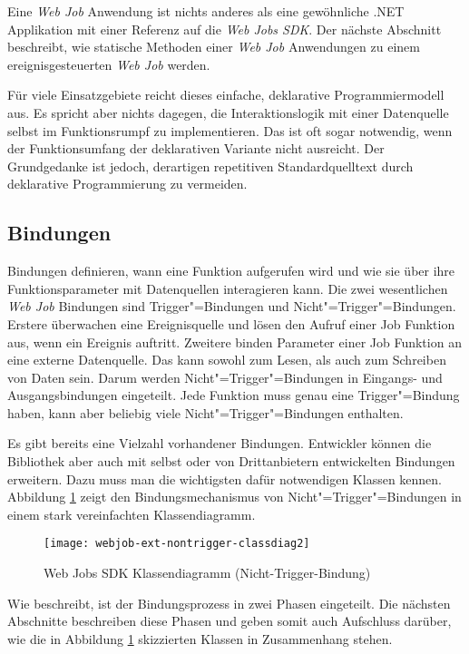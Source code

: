 Eine \textit{Web Job} Anwendung ist nichts anderes als eine gewöhnliche .NET Applikation mit einer Referenz auf die \textit{Web Jobs SDK}. Der nächste Abschnitt beschreibt, wie statische Methoden einer \textit{Web Job} Anwendungen zu einem ereignisgesteuerten \textit{Web Job} werden.

Für viele Einsatzgebiete reicht dieses einfache, deklarative Programmiermodell aus. Es spricht aber nichts dagegen, die Interaktionslogik mit einer Datenquelle selbst im Funktionsrumpf zu implementieren. Das ist oft sogar notwendig, wenn der Funktionsumfang der deklarativen Variante nicht ausreicht. Der Grundgedanke ist jedoch, derartigen repetitiven Standardquelltext durch deklarative Programmierung zu vermeiden.

\subsection{Bindungen}

Bindungen definieren, wann eine Funktion aufgerufen wird und wie sie über ihre Funktionsparameter mit Datenquellen interagieren kann. Die zwei wesentlichen \textit{Web Job} Bindungen sind Trigger"=Bindungen und Nicht"=Trigger"=Bindungen. Erstere überwachen eine Ereignisquelle und lösen den Aufruf einer Job Funktion aus, wenn ein Ereignis auftritt. Zweitere binden Parameter einer Job Funktion an eine externe Datenquelle. Das kann sowohl zum Lesen, als auch zum Schreiben von Daten sein. Darum werden Nicht"=Trigger"=Bindungen in Eingangs- und Ausgangsbindungen eingeteilt. Jede Funktion muss genau eine Trigger"=Bindung haben, kann aber beliebig viele Nicht"=Trigger"=Bindungen enthalten.

Es gibt bereits eine Vielzahl vorhandener Bindungen. Entwickler können die Bibliothek aber auch mit selbst oder von Drittanbietern entwickelten Bindungen erweitern. Dazu muss man die wichtigsten dafür notwendigen Klassen kennen. Abbildung \ref{fig:webjobsclassdiag} zeigt den Bindungsmechanismus von Nicht"=Trigger"=Bindungen in einem stark vereinfachten Klassendiagramm.

\begin{figure}[!hbt]%
\texttt{[image: webjob-ext-nontrigger-classdiag2]}%
\caption{Web Jobs SDK Klassendiagramm (Nicht-Trigger-Bindung)}%
\label{fig:webjobsclassdiag}%
\end{figure}

Wie \cite{WebJobsSdkBindingProcess} beschreibt, ist der Bindungsprozess in zwei Phasen eingeteilt. Die nächsten Abschnitte beschreiben diese Phasen und geben somit auch Aufschluss darüber, wie die in Abbildung \ref{fig:webjobsclassdiag} skizzierten Klassen in Zusammenhang stehen.


